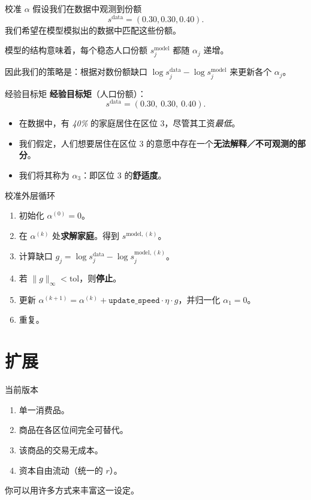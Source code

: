 \documentclass[10pt,aspectratio=169]{beamer}
\begin{document}
\begin{frame}{校准 $\alpha$}
  假设我们在数据中观测到份额
  \[
    s^\text{data} = (0.30, 0.30, 0.40).
  \]
  我们希望在模型模拟出的数据中匹配这些份额。

  模型的结构意味着，每个稳态人口份额 $s_j^\text{model}$ 都随 $\alpha_j$ 递增。

  因此我们的策略是：根据对数份额缺口 $\log s_j^{\text{data}} - \log s_j^{\text{model}}$ 来更新各个 $\alpha_j$。
\end{frame}

\begin{frame}{经验目标矩}
  \textbf{经验目标矩}（人口份额）：
  \[
  s^{\text{data}} = (0.30,\ 0.30,\ 0.40).
  \]

  \begin{itemize}
    \item 在数据中，有 \emph{40\%} 的家庭居住在区位 3，尽管其工资\emph{最低}。
    \item 我们假定，人们想要居住在区位 3 的意愿中存在一个\textbf{无法解释／不可观测的部分}。
    \item 我们将其称为 $\alpha_3$：即区位 3 的\textbf{舒适度}。
  \end{itemize}
\end{frame}

\begin{frame}{校准外层循环}
  \begin{enumerate}
    \item 初始化 $\alpha^{(0)} = 0$。
    \item 在 $\alpha^{(k)}$ 处\textbf{求解家庭}。得到 $s^{\text{model}, (k)}$。
    \item 计算缺口 $g_j = \log s_j^{\text{data}} - \log s_j^{\text{model}, (k)}$。
    \item 若 $\| g \|_\infty < \text{tol}$，则\textbf{停止}。
    \item 更新 $\alpha^{(k+1)} = \alpha^{(k)} + \texttt{update\_speed} \cdot \eta \cdot g$，并归一化 $\alpha_1 = 0$。
    \item 重复。
  \end{enumerate}
\end{frame}

\section[扩展]{扩展}

\begin{frame}{当前版本}
  \begin{enumerate}
    \item 单一消费品。
    \item 商品在各区位间完全可替代。
    \item 该商品的交易无成本。
    \item 资本自由流动（统一的 $r$）。
  \end{enumerate}

  你可以用许多方式来丰富这一设定。
\end{frame}
\end{document}
